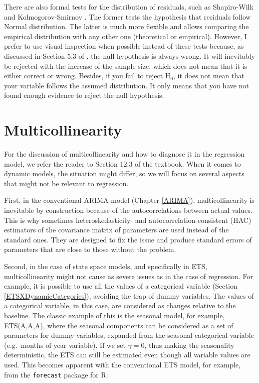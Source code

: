 \documentclass[
]{book}
\theoremstyle{definition}
\theoremstyle{definition}
\theoremstyle{definition}
\theoremstyle{definition}
\theoremstyle{remark}
\begin{document}
There are also formal tests for the distribution of residuals, such as Shapiro-Wilk \citep{WikipediaShapiroWilk2021} and Kolmogorov-Smirnov \citep{WikipediaKolmogorovSmirnov2021}. The former tests the hypothesis that residuals follow Normal distribution. The latter is much more flexible and allows comparing the empirical distribution with any other one (theoretical or empirical). However, I prefer to use visual inspection when possible instead of these tests because, as discussed in Section 5.3 of \citet{SvetunkovSBA}, the null hypothesis is always wrong. It will inevitably be rejected with the increase of the sample size, which does not mean that it is either correct or wrong. Besides, if you fail to reject H\(_0\), it does not mean that your variable follows the assumed distribution. It only means that you have not found enough evidence to reject the null hypothesis.

\hypertarget{diagnosticsMulticollinearity}{%
\section{Multicollinearity}\label{diagnosticsMulticollinearity}}

For the discussion of multicollinearity and how to diagnose it in the regression model, we refer the reader to Section 12.3 of the \citet{SvetunkovSBA} textbook. When it comes to dynamic models, the situation might differ, so we will focus on several aspects that might not be relevant to regression.

First, in the conventional ARIMA model (Chapter \ref{ARIMA}), multicollinearity is inevitable by construction because of the autocorrelations between actual values. This is why sometimes heteroskedasticity- and autocorrelation-consistent (HAC) estimators of the covariance matrix \citep[see Section 15.4 of][]{Hanck2020} of parameters are used instead of the standard ones. They are designed to fix the issue and produce standard errors of parameters that are close to those without the problem.

Second, in the case of state space models, and specifically in ETS, multicollinearity might not cause as severe issues as in the case of regression. For example, it is possible to use all the values of a categorical variable (Section \ref{ETSXDynamicCategories}), avoiding the trap of dummy variables. The values of a categorical variable, in this case, are considered as changes relative to the baseline. The classic example of this is the seasonal model, for example, ETS(A,A,A), where the seasonal components can be considered as a set of parameters for dummy variables, expanded from the seasonal categorical variable (e.g.~months of year variable). If we set \(\gamma=0\), thus making the seasonality deterministic, the ETS can still be estimated even though all variable values are used. This becomes apparent with the conventional ETS model, for example, from the \texttt{forecast} package for R:
\end{document}

